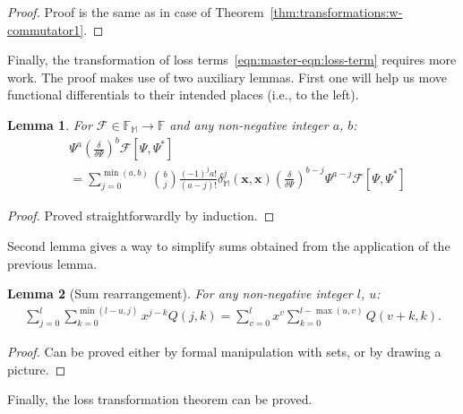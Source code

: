 \documentclass[12pt,aip,jmp,amssymb,amsmath]{revtex4-1}
\newtheorem{lemma}{Lemma}
\begin{document}
\begin{proof}
Proof is the same as in case of Theorem~\ref{thm:transformations:w-commutator1}.
\end{proof}

Finally, the transformation of loss terms~\ref{eqn:master-eqn:loss-term} requires more work.
The proof makes use of two auxiliary lemmas.
First one will help us move functional differentials to their intended places (i.e., to the left).

\begin{lemma}
\label{lmm:transformations:swap-differential}
    For $\mathcal{F} \in \mathbb{F}_{\mathbb{M}} \rightarrow \mathbb{F}$ and any non-negative integer $a$, $b$:
    \begin{equation*}\begin{split}
    &    \Psi^a \left( \frac{\delta}{\delta \Psi} \right)^b \mathcal{F}[\Psi, \Psi^*] \\
    &    = \sum_{j=0}^{\min(a, b)}
            \binom{b}{j} \frac{(-1)^j a!}{(a - j)!}
            \delta_{\mathbb{M}}^j(\boldsymbol{x}, \boldsymbol{x})
            \left( \frac{\delta}{\delta \Psi} \right)^{b - j}
            \Psi^{a - j}
            \mathcal{F}[\Psi, \Psi^*]
    \end{split}\end{equation*}
\end{lemma}
\begin{proof}
Proved straightforwardly by induction.
\end{proof}

Second lemma gives a way to simplify sums obtained from the application of the previous lemma.

\begin{lemma}[Sum rearrangement]
\label{lmm:transformations:sum-rearrangement}
    For any non-negative integer $l$, $u$:
    \begin{equation*}\begin{split}
        \sum_{j=0}^l \sum_{k=0}^{\min(l-u,j)} x^{j-k} Q(j, k)
        = \sum_{v=0}^l x^v \sum_{k=0}^{l-\max(u,v)} Q(v + k, k).
    \end{split}\end{equation*}
\end{lemma}
\begin{proof}
Can be proved either by formal manipulation with sets, or by drawing a picture.
\end{proof}

Finally, the loss transformation theorem can be proved.
\end{document}

